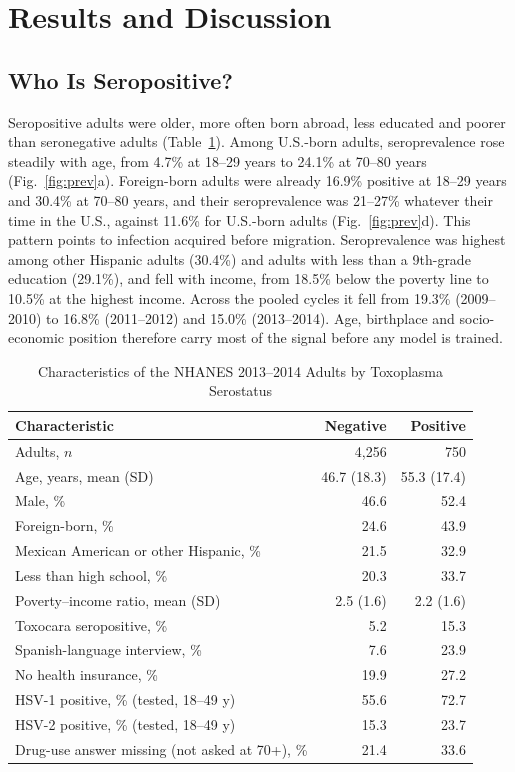 \documentclass[conference]{IEEEtran}
\begin{document}
\section{Results and Discussion}
\subsection{Who Is Seropositive?}
\label{sec:who}
Seropositive adults were older, more often born abroad, less educated and poorer than seronegative adults (Table~\ref{tab:cohort}).
Among U.S.-born adults, seroprevalence rose steadily with age, from 4.7\% at 18--29 years to 24.1\% at 70--80 years
(Fig.~\ref{fig:prev}a). Foreign-born adults were already 16.9\% positive at 18--29 years and 30.4\% at 70--80 years, and
their seroprevalence was 21--27\% whatever their time in the U.S., against 11.6\% for U.S.-born adults (Fig.~\ref{fig:prev}d). This
pattern points to infection acquired before migration. Seroprevalence was highest among other Hispanic adults (30.4\%) and adults with
less than a 9th-grade education (29.1\%), and fell with income, from 18.5\% below the poverty line to 10.5\% at the highest income.
Across the pooled cycles it fell from 19.3\% (2009--2010) to 16.8\% (2011--2012) and 15.0\% (2013--2014). Age, birthplace and
socio-economic position therefore carry most of the signal before any model is trained.

\begin{table}[t]
\caption{Characteristics of the NHANES 2013--2014 Adults by Toxoplasma Serostatus}
\label{tab:cohort}
\centering
\setlength{\tabcolsep}{4pt}
\begin{tabular}{@{}lrr@{}}
\toprule
Characteristic & Negative & Positive \\
\midrule
Adults, $n$ & 4,256 & 750 \\
Age, years, mean (SD) & 46.7 (18.3) & 55.3 (17.4) \\
Male, \% & 46.6 & 52.4 \\
Foreign-born, \% & 24.6 & 43.9 \\
Mexican American or other Hispanic, \% & 21.5 & 32.9 \\
Less than high school, \% & 20.3 & 33.7 \\
Poverty--income ratio, mean (SD) & 2.5 (1.6) & 2.2 (1.6) \\
Toxocara seropositive, \% & 5.2 & 15.3 \\
Spanish-language interview, \% & 7.6 & 23.9 \\
No health insurance, \% & 19.9 & 27.2 \\
HSV-1 positive, \% (tested, 18--49 y) & 55.6 & 72.7 \\
HSV-2 positive, \% (tested, 18--49 y) & 15.3 & 23.7 \\
Drug-use answer missing (not asked at 70+), \% & 21.4 & 33.6 \\
\bottomrule
\end{tabular}
\end{table}
\end{document}
